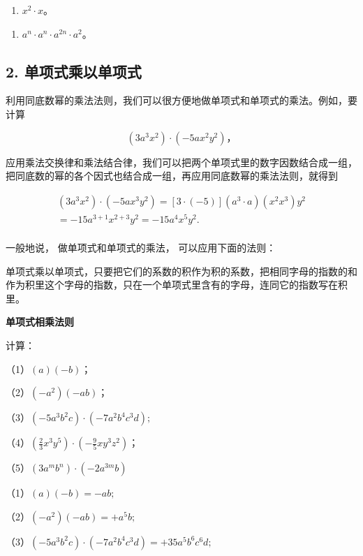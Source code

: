 \begin{enumerate}[start=6]
\item
  \(x^{2} \cdot x\)。
\end{enumerate}

\begin{enumerate}[start=9]
\item
  \(a^n \cdot a^n \cdot a^{2n} \cdot a^2\)。
\end{enumerate}

\subsection{2. 单项式乘以单项式}

利用同底数幂的乘法法则，我们可以很方便地做单项式和单项式的乘法。例如，要计算

\[
(3 a ^{3} x ^{2}) \cdot (- 5 a x ^{2} y ^{2})\text{，}
\]

应用乘法交换律和乘法结合律，我们可以把两个单项式里的数字因数结合成一组，把同底数的幂的各个因式也结合成一组，再应用同底数幂的乘法法则，就得到

\[
\begin{array}{l} (3 a ^{3} x ^{2}) \cdot (- 5 a x ^{3} y ^{2}) = [ 3 \cdot (- 5) ] (a ^{3} \cdot a) (x ^{2} x ^{3}) y ^{2} \\ = - 15 a ^{3 + 1} x ^{2 + 3} y ^{2} = - 15 a ^{4} x ^{5} y ^{2}. \\ \end{array}
\]

一般地说， 做单项式和单项式的乘法， 可以应用下面的法则：

单项式乘以单项式，只要把它们的系数的积作为积的系数，把相同字母的指数的和作为积里这个字母的指数，只在一个单项式里含有的字母，连同它的指数写在积里。

\textbf{单项式相乘法则}

 计算：

（1）\((a)(-b)\)；

（2）\((-a^{2})(-ab)\)；

（3）\((-5a^{3}b^{2}c)\cdot (-7a^{2}b^{4}c^{3}d);\)

（4）\(\left(\frac{2}{3} x^3 y^5\right) \cdot \left(-\frac{9}{5} xy^3 z^2\right)\)；

（5）\((3a^{m}b^{n})\cdot (-2a^{3m}b)\)

 （1）\((a)(-b) = -ab;\)

（2）\((-a^2)(-ab) = +a^5b;\)

（3）\((-5a^{3}b^{2}c)\cdot (-7a^{2}b^{4}c^{3}d) = +35a^{5}b^{6}c^{6}d;\)

